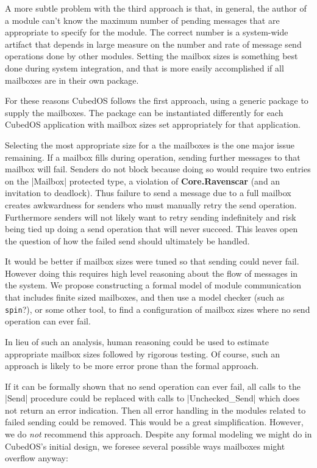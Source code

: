 A more subtle problem with the third approach is that, in general, the author of a module can't
know the maximum number of pending messages that are appropriate to specify for the module. The
correct number is a system-wide artifact that depends in large measure on the number and rate of
message send operations done by other modules. Setting the mailbox sizes is something best done
during system integration, and that is more easily accomplished if all mailboxes are in their
own package.

For these reasons CubedOS follows the first approach, using a generic package to supply the
mailboxes. The package can be instantiated differently for each CubedOS application with mailbox
sizes set appropriately for that application.

Selecting the most appropriate size for a the mailboxes is the one major issue remaining. If a
mailbox fills during operation, sending further messages to that mailbox will fail. Senders do
not block because doing so would require two entries on the |Mailbox| protected type, a
violation of \textbf{Core.Ravenscar} (and an invitation to deadlock). Thus failure to send a
message due to a full mailbox creates awkwardness for senders who must manually retry the send
operation. Furthermore senders will not likely want to retry sending indefinitely and risk being
tied up doing a send operation that will never succeed. This leaves open the question of how the
failed send should ultimately be handled.

It would be better if mailbox sizes were tuned so that sending could never fail. However doing
this requires high level reasoning about the flow of messages in the system. We propose
constructing a formal model of module communication that includes finite sized mailboxes, and
then use a model checker (such as \texttt{spin}?), or some other tool, to find a configuration
of mailbox sizes where no send operation can ever fail.

In lieu of such an analysis, human reasoning could be used to estimate appropriate mailbox sizes
followed by rigorous testing. Of course, such an approach is likely to be more error prone than
the formal approach.

If it can be formally shown that no send operation can ever fail, all calls to the |Send|
procedure could be replaced with calls to |Unchecked_Send| which does not return an error
indication. Then all error handling in the modules related to failed sending could be removed.
This would be a great simplification. However, we do \emph{not} recommend this approach. Despite
any formal modeling we might do in CubedOS's initial design, we foresee several possible ways
mailboxes might overflow anyway:

